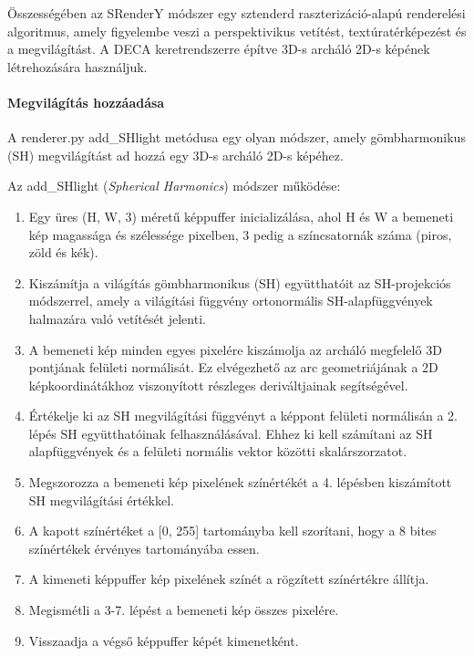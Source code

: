 \documentclass[12pt,a4]{article}
\begin{document}
            Összességében az SRenderY módszer egy sztenderd raszterizáció-alapú renderelési algoritmus, amely figyelembe veszi a perspektivikus vetítést,
            textúratérképezést és a megvilágítást. A DECA keretrendszerre építve 3D-s archáló 2D-s képének létrehozására használjuk.

        \paragraph{Megvilágítás hozzáadása}
            A renderer.py add\_SHlight metódusa egy olyan módszer, amely gömbharmonikus (SH) megvilágítást ad hozzá egy 3D-s archáló 2D-s képéhez.

            Az add\_SHlight (\textit{Spherical Harmonics}) módszer működése:
            
            \begin{enumerate}
                \item Egy üres (H, W, 3) méretű képpuffer inicializálása, ahol H és W a bemeneti kép magassága és szélessége pixelben, 3 pedig a színcsatornák száma (piros, zöld és kék).
            
                \item Kiszámítja a világítás gömbharmonikus (SH) együtthatóit az SH-projekciós módszerrel, amely a világítási függvény ortonormális SH-alapfüggvények halmazára való vetítését jelenti.
            
                \item A bemeneti kép minden egyes pixelére kiszámolja az archáló megfelelő 3D pontjának felületi normálisát. Ez elvégezhető az arc geometriájának a 2D képkoordinátákhoz viszonyított részleges deriváltjainak segítségével.
            
                \item Értékelje ki az SH megvilágítási függvényt a képpont felületi normálisán a 2. lépés SH együtthatóinak felhasználásával. Ehhez ki kell számítani az SH alapfüggvények és a felületi normális vektor közötti skalárszorzatot.
            
                \item Megszorozza a bemeneti kép pixelének színértékét a 4. lépésben kiszámított SH megvilágítási értékkel.
            
                \item A kapott színértéket a [0, 255] tartományba kell szorítani, hogy a 8 bites színértékek érvényes tartományába essen.
            
                \item A kimeneti képpuffer kép pixelének színét a rögzített színértékre állítja.
            
                \item Megismétli a 3-7. lépést a bemeneti kép összes pixelére.
            
                \item Visszaadja a végső képpuffer képét kimenetként.
            
                
            \end{enumerate}
            
\end{document}
